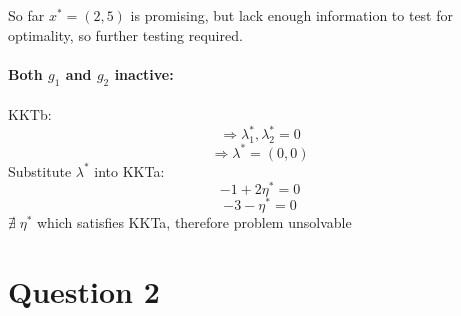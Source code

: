 \documentclass{article}
\begin{document}
So far $x^*=(2,5)$ is promising, but lack enough information to test for optimality, so further testing required.\\
\\
\hspace*{10mm}
\textbf{Both $g_1$ and $g_2$ inactive:}\\
\\
\hspace*{20mm}
KKTb:
$$\Rightarrow \lambda_1^*, \lambda_2^*=0$$
$$\Rightarrow \lambda^* = (0,0)$$
\hspace*{20mm}
Substitute $\lambda^*$ into KKTa:
$$-1+2\eta^*=0$$
$$-3-\eta^*=0$$
\hspace*{20mm}
$\nexists\; \eta^*$ which satisfies KKTa, therefore problem unsolvable

\newpage
\section*{Question 2}
\end{document}
